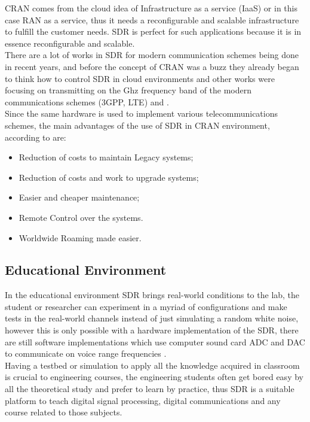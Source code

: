 CRAN comes from the cloud idea of Infrastructure as a service (IaaS) or in this
case RAN as a service, thus it needs a reconfigurable and scalable
infrastructure to fulfill the customer needs. SDR is perfect for such
applications because  it is in essence reconfigurable and scalable.\\

There are a lot of works in SDR for modern communication schemes being done in
recent years, and before the concept of CRAN was a buzz they already began to
think how to control SDR in cloud environments \cite{dayananda2012} and other
works were focusing on transmitting on the Ghz frequency band of the modern
communications schemes (3GPP, LTE) \cite{kelley2009} and \cite{neenu2014}.\\

Since the same hardware is used to implement various telecommunications schemes,
the main advantages of the use of SDR in CRAN environment, according to
\cite{dayananda2012} are:

\begin{itemize}
    \item Reduction of costs to maintain Legacy systems;
    \item Reduction of costs and work to upgrade systems;
    \item Easier and cheaper maintenance;
    \item Remote Control over the systems.
    \item Worldwide Roaming made easier.
\end{itemize}


\subsection{Educational Environment}

In the educational environment SDR brings real-world conditions to the lab, the
student or researcher can experiment in a myriad of configurations and make
tests in the real-world channels instead of just simulating a random white
noise, however this is only possible with a hardware implementation of the SDR,
there are still software implementations which use computer sound card ADC and
DAC to communicate on voice range frequencies \cite{ladimer2009}.\\

Having a testbed or simulation to apply all the knowledge acquired in classroom
is crucial to engineering courses, the engineering students often get bored easy
by all the theoretical study and prefer to learn by practice, thus SDR is a
suitable platform to teach digital signal processing, digital communications and
any course related to those subjects.\\

